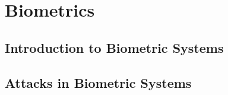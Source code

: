 \chapter{Biometrics}
\label{chap:Biometrics}

\section{Introduction to Biometric Systems}
\label{sec:IntroBiome}

\section{Attacks in Biometric Systems}
\label{sec:AttacksBiometric}
